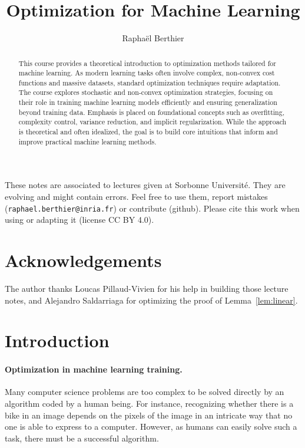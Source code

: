 \documentclass[11pt,reqno]{article}
\numberwithin{equation}{section}
\theoremstyle{plain}
\theoremstyle{definition}
\theoremstyle{remark}
\begin{document}
\title{Optimization for Machine Learning}

\author{Raphaël Berthier}

\maketitle

These notes are associated to lectures given at Sorbonne Université. They are evolving and might contain errors. Feel free to use them, report mistakes (\texttt{raphael.berthier@inria.fr}) or contribute (github). Please cite this work when using or adapting it (license CC BY 4.0).

\begin{abstract}
	This course provides a theoretical introduction to optimization methods tailored for machine learning. As modern learning tasks often involve complex, non-convex cost functions and massive datasets, standard optimization techniques require adaptation. The course explores stochastic and non-convex optimization strategies, focusing on their role in training machine learning models efficiently and ensuring generalization beyond training data. Emphasis is placed on foundational concepts such as overfitting, complexity control, variance reduction, and implicit regularization. While the approach is theoretical and often idealized, the goal is to build core intuitions that inform and improve practical machine learning methods.
\end{abstract}

\noindent

\tableofcontents

\section*{Acknowledgements}

The author thanks Loucas Pillaud-Vivien for his help in building those lecture notes, and Alejandro Saldarriaga for optimizing the proof of Lemma~\ref{lem:linear}.

\newpage

\section{Introduction}

\paragraph{Optimization in machine learning training.}Many computer science problems are too complex to be solved directly by an algorithm coded by a human being. For instance, recognizing whether there is a bike in an image depends on the pixels of the image in an intricate way that no one is able to express to a computer. However, as humans can easily solve such a task, there must be a successful algorithm.
\end{document}
